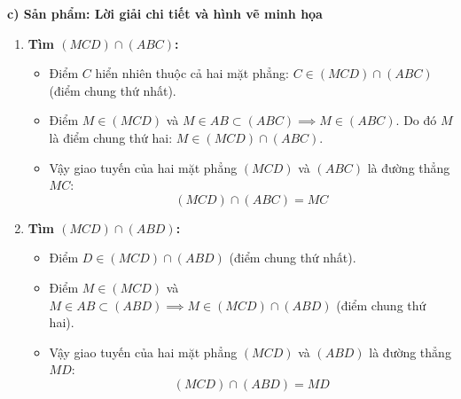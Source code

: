 \documentclass[12pt, a4paper]{article}
\begin{document}
\noindent \textbf{c) Sản phẩm: Lời giải chi tiết và hình vẽ minh họa}
\begin{center}
\end{center}
\begin{enumerate}[leftmargin=0.6cm]
    \item \textbf{Tìm $(MCD) \cap (ABC)$:}
    \begin{itemize}
        \item Điểm $C$ hiển nhiên thuộc cả hai mặt phẳng: $C \in (MCD) \cap (ABC)$ (điểm chung thứ nhất).
        \item Điểm $M \in (MCD)$ và $M \in AB \subset (ABC) \implies M \in (ABC)$. Do đó $M$ là điểm chung thứ hai: $M \in (MCD) \cap (ABC)$.
        \item Vậy giao tuyến của hai mặt phẳng $(MCD)$ và $(ABC)$ là đường thẳng $MC$:
        $$(MCD) \cap (ABC) = MC$$
    \end{itemize}

    \item \textbf{Tìm $(MCD) \cap (ABD)$:}
    \begin{itemize}
        \item Điểm $D \in (MCD) \cap (ABD)$ (điểm chung thứ nhất).
        \item Điểm $M \in (MCD)$ và $M \in AB \subset (ABD) \implies M \in (MCD) \cap (ABD)$ (điểm chung thứ hai).
        \item Vậy giao tuyến của hai mặt phẳng $(MCD)$ và $(ABD)$ là đường thẳng $MD$:
        $$(MCD) \cap (ABD) = MD$$
    \end{itemize}
\end{enumerate}
\end{document}
